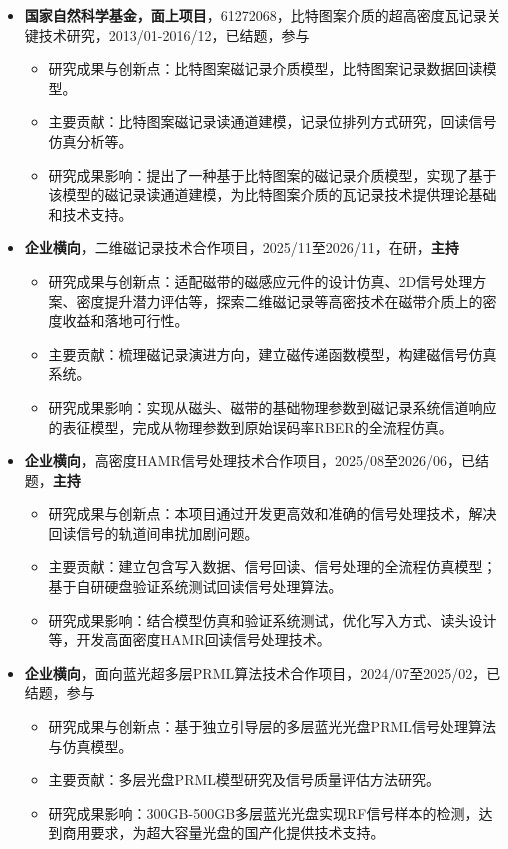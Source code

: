 \documentclass[zh]{resume}
\begin{document}
\begin{itemize}
  \item \textbf{国家自然科学基金，面上项目}，61272068，比特图案介质的超高密度瓦记录关键技术研究，2013/01-2016/12，已结题，参与
  \begin{itemize}
    \item 研究成果与创新点：比特图案磁记录介质模型，比特图案记录数据回读模型。
    \item 主要贡献：比特图案磁记录读通道建模，记录位排列方式研究，回读信号仿真分析等。
    \item 研究成果影响：提出了一种基于比特图案的磁记录介质模型，实现了基于该模型的磁记录读通道建模，为比特图案介质的瓦记录技术提供理论基础和技术支持。
  \end{itemize}

  \item \textbf{企业横向}，二维磁记录技术合作项目，2025/11至2026/11，在研，\textbf{主持}
  \begin{itemize}
    \item 研究成果与创新点：适配磁带的磁感应元件的设计仿真、2D信号处理方案、密度提升潜力评估等，探索二维磁记录等高密技术在磁带介质上的密度收益和落地可行性。 
    \item 主要贡献：梳理磁记录演进方向，建立磁传递函数模型，构建磁信号仿真系统。
    \item 研究成果影响：实现从磁头、磁带的基础物理参数到磁记录系统信道响应的表征模型，完成从物理参数到原始误码率RBER的全流程仿真。
  \end{itemize}
  
  \item \textbf{企业横向}，高密度HAMR信号处理技术合作项目，2025/08至2026/06，已结题，\textbf{主持}
  \begin{itemize}
    \item 研究成果与创新点：本项目通过开发更高效和准确的信号处理技术，解决回读信号的轨道间串扰加剧问题。
    \item 主要贡献：建立包含写入数据、信号回读、信号处理的全流程仿真模型；基于自研硬盘验证系统测试回读信号处理算法。
    \item 研究成果影响：结合模型仿真和验证系统测试，优化写入方式、读头设计等，开发高面密度HAMR回读信号处理技术。
  \end{itemize}

  \item \textbf{企业横向}，面向蓝光超多层PRML算法技术合作项目，2024/07至2025/02，已结题，参与
  \begin{itemize}
    \item 研究成果与创新点：基于独立引导层的多层蓝光光盘PRML信号处理算法与仿真模型。
    \item 主要贡献：多层光盘PRML模型研究及信号质量评估方法研究。
    \item 研究成果影响：300GB-500GB多层蓝光光盘实现RF信号样本的检测，达到商用要求，为超大容量光盘的国产化提供技术支持。
  \end{itemize}


\end{itemize}
\end{document}
